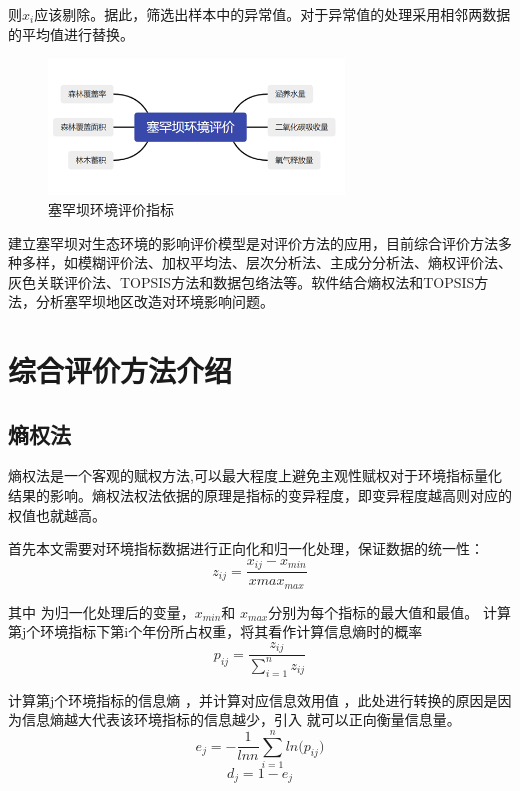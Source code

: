 \documentclass[UTF8]{ctexart}
\begin{document}
则$x_i$应该剔除。据此，筛选出样本中的异常值。对于异常值的处理采用相邻两数据的平均值进行替换。

\begin{figure}[H] %
    \centering %
    \includegraphics[width=0.7\textwidth]{./picture/saihanbapj.png} %
    \caption{塞罕坝环境评价指标} 
\end{figure}

建立塞罕坝对生态环境的影响评价模型是对评价方法的应用，目前综合评价方法多种多样，如模糊评价法、加权平均法、层次分析法、主成分分析法、熵权评价法、灰色关联评价法、TOPSIS方法和数据包络法等。软件结合熵权法和TOPSIS方法，分析塞罕坝地区改造对环境影响问题。

\newpage
\section{综合评价方法介绍}
\subsection{熵权法}
熵权法是一个客观的赋权方法,可以最大程度上避免主观性赋权对于环境指标量化结果的影响。熵权法权法依据的原理是指标的变异程度，即变异程度越高则对应的权值也就越高。

首先本文需要对环境指标数据进行正向化和归一化处理，保证数据的统一性：
\begin{equation}
    z_{ij}=\frac{x_{ij}-x_{min}}{{xmax}_{max}}
\end{equation}

其中 为归一化处理后的变量，$x_{min}$和 $x_{max}$分别为每个指标的最大值和最值。
计算第j个环境指标下第i个年份所占权重，将其看作计算信息熵时的概率 
\begin{equation}
    p_{ij}=\frac{z_{ij}}{\sum_{i=1}^{n}z_{ij}} 
\end{equation}

计算第j个环境指标的信息熵 ，并计算对应信息效用值 ，此处进行转换的原因是因为信息熵越大代表该环境指标的信息越少，引入 就可以正向衡量信息量。
\begin{equation}
    e_j=-\frac{1}{ln{n}}\sum_{i=1}^{n}{ln{(}p_{ij})}
\end{equation}
\begin{equation}
    d_j=1-e_j
\end{equation}
\end{document}
